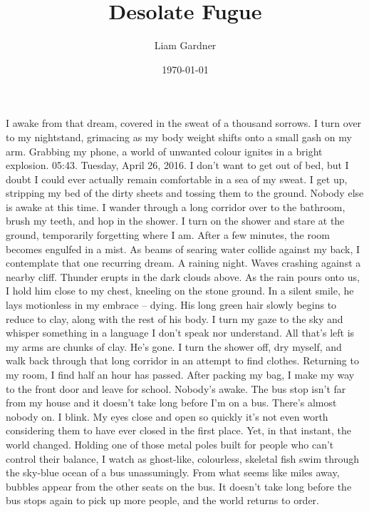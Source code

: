 \documentclass[a4paper, 12pt]{book}
\title{Desolate Fugue}
\author{Liam Gardner}
\date{\today}
\newcommand\tab[1][1cm]{\hspace*{#1}}
\begin{document}
\maketitle
\tab
I awake from that dream, covered in the sweat of a thousand sorrows. I turn over to my nightstand, grimacing as my body weight shifts onto a small gash on my arm. Grabbing my phone, a world of unwanted colour ignites in a bright explosion. 05:43. Tuesday, April 26, 2016. I don’t want to get out of bed, but I doubt I could ever actually remain comfortable in a sea of my sweat.
\newline
\tab
I get up, stripping my bed of the dirty sheets and tossing them to the ground. Nobody else is awake at this time. I wander through a long corridor over to the bathroom, brush my teeth, and hop in the shower. I turn on the shower and stare at the ground, temporarily forgetting where I am. After a few minutes, the room becomes engulfed in a mist. As beams of searing water collide against my back, I contemplate that one recurring dream.
\newline
\tab
A raining night. Waves crashing against a nearby cliff. Thunder erupts in the dark clouds above. As the rain pours onto us, I hold him close to my chest, kneeling on the stone ground. In a silent smile, he lays motionless in my embrace -- dying. His long green hair slowly begins to reduce to clay, along with the rest of his body. I turn my gaze to the sky and whisper something in a language I don’t speak nor understand. All that’s left is my arms are chunks of clay. He’s gone.
\newline
\tab
I turn the shower off, dry myself, and walk back through that long corridor in an attempt to find clothes. Returning to my room, I find half an hour has passed. After packing my bag, I make my way to the front door and leave for school. Nobody’s awake.
\newline
\tab
The bus stop isn’t far from my house and it doesn’t take long before I’m on a bus. There’s almost nobody on. I blink. My eyes close and open so quickly it’s not even worth considering them to have ever closed in the first place. Yet, in that instant, the world changed. Holding one of those metal poles built for people who can’t control their balance, I watch as ghost-like, colourless, skeletal fish swim through the sky-blue ocean of a bus unassumingly. From what seems like miles away, bubbles appear from the other seats on the bus. It doesn’t take long before the bus stops again to pick up more people, and the world returns to order. 
\newline
\end{document}

